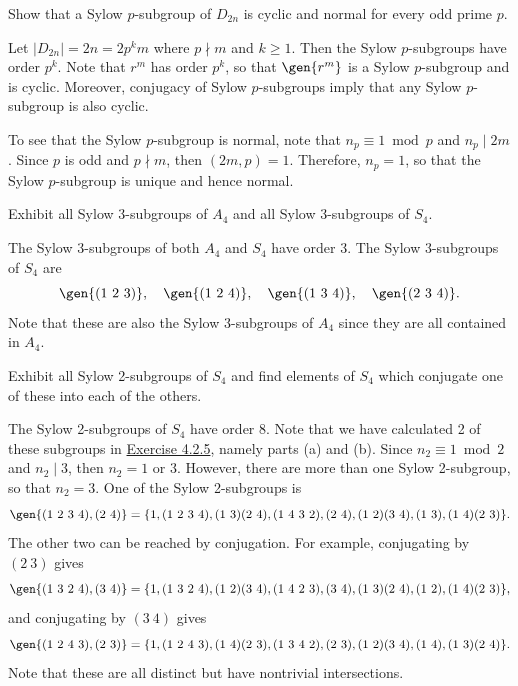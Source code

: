 \begin{exercise}\label{ex4.5.5}
	Show that a Sylow $p$-subgroup of $D_{2n}$ is cyclic and normal for every odd prime $p$.
\end{exercise}

\begin{sol}
	Let $|D_{2n}| = 2n = 2 p^k m$ where $p \nmid m$ and $k \geq 1$. Then the Sylow $p$-subgroups have order $p^k$. Note that $r^m$ has order $p^k$, so that $\gen{r^m}$ is a Sylow $p$-subgroup and is cyclic. Moreover, conjugacy of Sylow $p$-subgroups imply that any Sylow $p$-subgroup is also cyclic.

	To see that the Sylow $p$-subgroup is normal, note that $n_p \equiv 1 \bmod p$ and $n_p \mid 2m$. Since $p$ is odd and $p \nmid m$, then $(2m, p) = 1$. Therefore, $n_p = 1$, so that the Sylow $p$-subgroup is unique and hence normal.
\end{sol}

\begin{exercise}\label{ex4.5.6}
	Exhibit all Sylow 3-subgroups of $A_4$ and all Sylow 3-subgroups of $S_4$.
\end{exercise}

\begin{sol}
	The Sylow 3-subgroups of both $A_4$ and $S_4$ have order 3. The Sylow 3-subgroups of $S_4$ are
	\[\gen{(1\ 2\ 3)}, \quad \gen{(1\ 2\ 4)}, \quad \gen{(1\ 3\ 4)}, \quad \gen{(2\ 3\ 4)}.\]
	Note that these are also the Sylow 3-subgroups of $A_4$ since they are all contained in $A_4$.
\end{sol}

\begin{exercise}\label{ex4.5.7}
	Exhibit all Sylow 2-subgroups of $S_4$ and find elements of $S_4$ which conjugate one of these into each of the others.
\end{exercise}

\begin{sol}
	The Sylow 2-subgroups of $S_4$ have order 8. Note that we have calculated 2 of these subgroups in \hyperref[ex4.2.5]{Exercise 4.2.5}, namely parts (a) and (b). Since $n_2 \equiv 1 \bmod 2$ and $n_2 \mid 3$, then $n_2 = 1$ or $3$. However, there are more than one Sylow 2-subgroup, so that $n_2 = 3$. One of the Sylow 2-subgroups is
	\[\gen{(1\ 2\ 3\ 4), (2\ 4)} = \{1, (1\ 2\ 3\ 4), (1\ 3)(2\ 4), (1\ 4\ 3\ 2), (2\ 4), (1\ 2)(3\ 4), (1\ 3), (1\ 4)(2\ 3)\}.\]
	The other two can be reached by conjugation. For example, conjugating by $(2\ 3)$ gives
	\[\gen{(1\ 3\ 2\ 4), (3\ 4)} = \{1, (1\ 3\ 2\ 4), (1\ 2)(3\ 4), (1\ 4\ 2\ 3), (3\ 4), (1\ 3)(2\ 4), (1\ 2), (1\ 4)(2\ 3)\},\]
	and conjugating by $(3\ 4)$ gives
	\[\gen{(1\ 2\ 4\ 3), (2\ 3)} = \{1, (1\ 2\ 4\ 3), (1\ 4)(2\ 3), (1\ 3\ 4\ 2), (2\ 3), (1\ 2)(3\ 4), (1\ 4), (1\ 3)(2\ 4)\}.\]
	Note that these are all distinct but have nontrivial intersections.
\end{sol}

